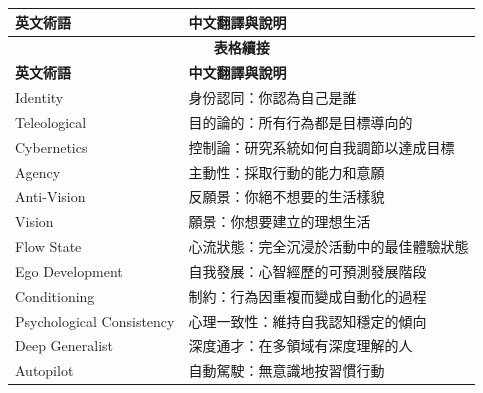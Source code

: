 \documentclass[12pt,a4paper]{article}
\begin{document}
\begin{longtable}{p{5cm}p{9cm}}
\toprule
\textbf{英文術語} & \textbf{中文翻譯與說明} \\
\midrule
\endfirsthead

\multicolumn{2}{c}{\textbf{表格續接}} \\
\toprule
\textbf{英文術語} & \textbf{中文翻譯與說明} \\
\midrule
\endhead

\bottomrule
\endfoot

Identity & 身份認同：你認為自己是誰 \\
Teleological & 目的論的：所有行為都是目標導向的 \\
Cybernetics & 控制論：研究系統如何自我調節以達成目標 \\
Agency & 主動性：採取行動的能力和意願 \\
Anti-Vision & 反願景：你絕不想要的生活樣貌 \\
Vision & 願景：你想要建立的理想生活 \\
Flow State & 心流狀態：完全沉浸於活動中的最佳體驗狀態 \\
Ego Development & 自我發展：心智經歷的可預測發展階段 \\
Conditioning & 制約：行為因重複而變成自動化的過程 \\
Psychological Consistency & 心理一致性：維持自我認知穩定的傾向 \\
Deep Generalist & 深度通才：在多領域有深度理解的人 \\
Autopilot & 自動駕駛：無意識地按習慣行動 \\
\bottomrule
\end{longtable}
\end{document}
